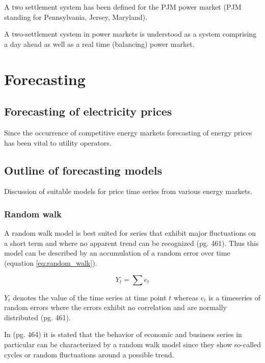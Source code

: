 A two settlement system has been defined for the PJM power market (PJM standing for Pennsylvania, Jersey, Maryland)\cite{lambert2001creating}. 

A two-settlement system in power markets is understood as a system comprising a day ahead as well as a real time (balancing) power market\cite{lambert2001creating}. 




\section{Forecasting}

\subsection{Forecasting of electricity prices}

Since the occurrence of competitive energy markets forecasting of energy prices has been vital to utility operators. 


\subsection{Outline of forecasting models}

Discussion of suitable models for price time series from various energy markets. 


\subsubsection{Random walk}

A random walk model is best suited for series that exhibit major fluctuations on a short term and where no apparent trend can be recognized \cite{makridakisforecasting}(pg. 461). Thus this model can be described by an accumulation of a random error over time (equation \ref{eq:random_walk}). 

\begin{equation}
Y_t = \sum e_t
\label{eq:random_walk}
\end{equation}

$Y_t$ denotes the value of the time series at time point $t$ whereas $e_t$ is a timeseries of random errors where the errors exhibit no correlation and are normally distributed \cite{makridakisforecasting}(pg. 461). 

In \cite{makridakisforecasting}(pg. 464) it is stated that the behavior of economic and business series in particular can be characterized by a random walk model since they show so-called cycles or random fluctuations around a possible trend. 

